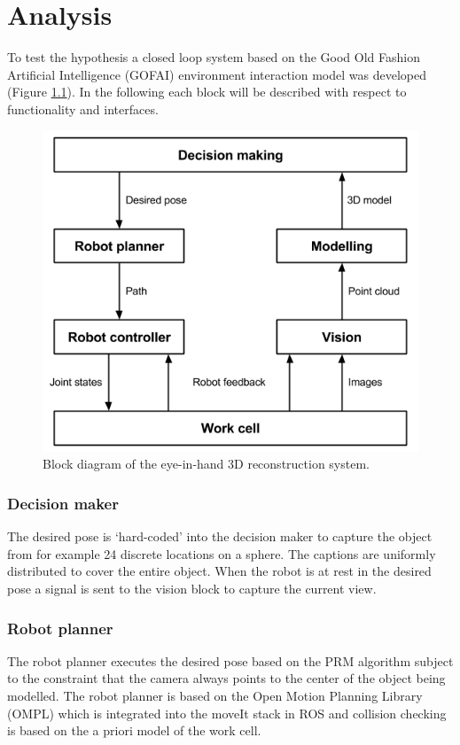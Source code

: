 \chapter{Analysis}
To test the hypothesis a closed loop system based on the Good Old Fashion Artificial Intelligence (GOFAI) environment interaction model \cite{Pfeifer2007} was developed (Figure \ref{fig:block_diagram}). In the following each block will be described with respect to functionality and interfaces.

\begin{figure}[htb]
	\begin{center}
		\includegraphics[scale=0.5,trim=0 0 0 0]{graphics/02_analysis/block_diagram.png}%
		\caption{Block diagram of the eye-in-hand 3D reconstruction system.}
		\label{fig:block_diagram}
	\end{center}
\end{figure}

\subsection{Decision maker}
The desired pose is ‘hard-coded’ into the decision maker to capture the object from for example 24 discrete locations on a sphere. The captions are uniformly distributed to cover the entire object. When the robot is at rest in the desired pose a signal is sent to the vision block to capture the current view.

\subsection{Robot planner}
The robot planner executes the desired pose based on the PRM algorithm subject to the constraint that the camera always points to the center of the object being modelled. The robot planner is based on the Open Motion Planning Library (OMPL) which is integrated into the moveIt stack in ROS and collision checking is based on the a priori model of the work cell.


